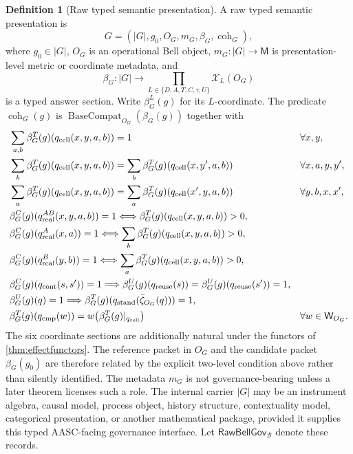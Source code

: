 \documentclass[11pt]{article}
\theoremstyle{definition}
\newtheorem{definition}[theorem]{Definition}
\newcommand{\Bell}{\mathcal{B}}
\newcommand{\RawBellGov}{\mathsf{RawBellGov}_{\Bell}}
\begin{document}
\begin{definition}[Raw typed semantic presentation]\label{def:bellgovpresentation}
A raw typed semantic presentation is
\[
G=(|G|,g_0,O_G,m_G,\beta_G,\operatorname{coh}_G),
\]
where $g_0\in|G|$, $O_G$ is an operational Bell object, $m_G:|G|\to\mathsf M$ is presentation-level metric or coordinate metadata, and
\[
\beta_G:|G|\longrightarrow
\prod_{L\in\{D,A,T,C,\tau,U\}}\mathscr X_L(O_G)
\]
is a typed answer section. Write $\beta_G^L(g)$ for its $L$-coordinate. The predicate $\operatorname{coh}_G(g)$ is $\operatorname{BaseCompat}_{O_G}(\beta_G(g))$ together with
\[
\begin{aligned}
&\sum_{a,b}\beta_G^T(g)(q_{\rm cell}(x,y,a,b))=1 &&\forall x,y,\\
&\sum_b\beta_G^T(g)(q_{\rm cell}(x,y,a,b))
 =\sum_b\beta_G^T(g)(q_{\rm cell}(x,y',a,b)) &&\forall x,a,y,y',\\
&\sum_a\beta_G^T(g)(q_{\rm cell}(x,y,a,b))
 =\sum_a\beta_G^T(g)(q_{\rm cell}(x',y,a,b)) &&\forall y,b,x,x',\\
&\beta_G^C(g)(q^{AB}_{\rm real}(x,y,a,b))=1
 \Longleftrightarrow \beta_G^T(g)(q_{\rm cell}(x,y,a,b))>0,\\
&\beta_G^C(g)(q^{A}_{\rm real}(x,a))=1
 \Longleftrightarrow \sum_b\beta_G^T(g)(q_{\rm cell}(x,y,a,b))>0,\\
&\beta_G^C(g)(q^{B}_{\rm real}(y,b))=1
 \Longleftrightarrow \sum_a\beta_G^T(g)(q_{\rm cell}(x,y,a,b))>0,\\
&\beta_G^C(g)(q_{\rm cont}(s,s'))=1
 \Longrightarrow \beta_G^U(g)(q_{\rm reuse}(s))=\beta_G^U(g)(q_{\rm reuse}(s'))=1,\\
&\beta_G^U(g)(q)=1
 \Longrightarrow \beta_G^T(g)(q_{\rm stand}(\bar\zeta_{O_G}(q)))=1,\\
&\beta_G^T(g)(q_{\rm cmp}(w))=w\bigl(\beta_G^T(g)|_{q_{\rm cell}}\bigr) &&\forall w\in\mathsf W_{O_G}.
\end{aligned}
\]
The six coordinate sections are additionally natural under the functors of \cref{thm:effectfunctors}. The reference packet in $O_G$ and the candidate packet $\beta_G(g_0)$ are therefore related by the explicit two-level condition above rather than silently identified. The metadata $m_G$ is not governance-bearing unless a later theorem licenses such a role. The internal carrier $|G|$ may be an instrument algebra, causal model, process object, history structure, contextuality model, categorical presentation, or another mathematical package, provided it supplies this typed AASC-facing governance interface. Let $\RawBellGov$ denote these records.
\end{definition}
\end{document}
